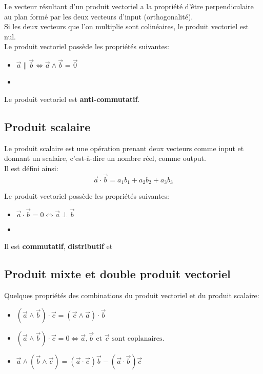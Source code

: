 \documentclass{article}
\numberwithin{equation}{section}
\begin{document}
Le vecteur résultant d'un produit vectoriel a la propriété d'être perpendiculaire au plan formé par les deux vecteurs d'input (orthogonalité).\\

Si les deux vecteurs que l'on multiplie sont colinéaires, le produit vectoriel est nul. \\

Le produit vectoriel possède les propriétés suivantes:
\begin{itemize}
	\item \(\vec a \parallel \vec b \Leftrightarrow \vec a \wedge \vec b = \vec 0\)
	\item
\end{itemize}
Le produit vectoriel est 	\textbf{anti-commutatif}. %

\subsection{Produit scalaire}
Le produit scalaire est une opération prenant deux vecteurs comme input et donnant un scalaire, c'est-à-dire un nombre réel, comme output. \\
Il est défini ainsi:
\begin{equation}
	\boxed{ \vec a \cdot \vec b = a_1b_1 + a_2b_2 + a_3b_3 }
\end{equation}

Le produit vectoriel possède les propriétés suivantes:
\begin{itemize}
	\item \(\vec a \cdot \vec b = 0 \Leftrightarrow \vec a \perp \vec b\)
	\item 
\end{itemize}

Il est \textbf{commutatif}, \textbf{distributif} et %

\subsection{Produit mixte et double produit vectoriel}
Quelques propriétés des combinations du produit vectoriel et du produit scalaire:
\begin{itemize}
	\item \((\vec a \wedge \vec b) \cdot \vec c = (\vec c \wedge \vec a) \cdot \vec b\)
	\item \((\vec a \wedge \vec b) \cdot \vec c = 0 \Leftrightarrow \vec a, \vec b \text{ et } \vec c \text{ sont coplanaires.}\)
	\item \(\vec a \wedge (\vec b \wedge \vec c) = (\vec a \cdot \vec c) \vec b - (\vec a \cdot \vec b) \vec c\)
\end{itemize}
\end{document}
